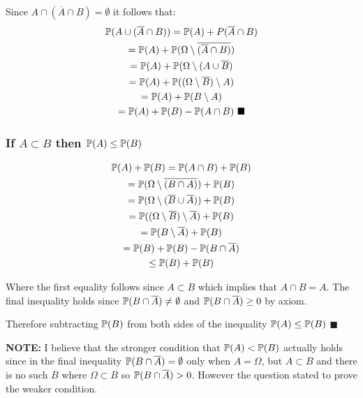 \documentclass[11pt, oneside]{article}   	%
\begin{document}
Since $A \cap (\overline{A} \cap B) = \emptyset$ it follows that:
\begin{gather*}
\Bbb P(A \cup (\overline{A} \cap B)) = \Bbb P(A) + P(\overline{A} \cap B) \\
= \Bbb P(A) + \Bbb P(\Omega \setminus \overline{(\overline{A} \cap B)}) \\
= \Bbb P(A) + \Bbb P(\Omega \setminus (A \cup \overline{B}) \\
= \Bbb P(A) + \Bbb P((\Omega \setminus \overline{B}) \setminus A) \\
= \Bbb P(A) + \Bbb P(B \setminus A) \\
= \Bbb P(A) + \Bbb P(B) - \Bbb P(A \cap B) \text{ } \blacksquare
\end{gather*}

\subsubsection{If $A \subset B$ then $\Bbb P(A) \leq \Bbb P(B)$}
\begin{gather*}
\Bbb P(A) + \Bbb P(B) = \Bbb P(A \cap B) + \Bbb P(B) \\
= \Bbb P(\Omega \setminus \overline{(B \cap A)}) + \Bbb P(B) \\
= \Bbb P(\Omega \setminus (\overline{B} \cup \overline{A})) + \Bbb P(B) \\
= \Bbb P((\Omega \setminus \overline{B}) \setminus \overline{A}) + \Bbb P(B) \\
= \Bbb P(B \setminus \overline{A}) + \Bbb P(B) \\
= \Bbb P(B) + \Bbb P(B) - \Bbb P(B \cap \overline{A})\\
\leq \Bbb P(B) + \Bbb P(B)
\end{gather*}

Where the first equality follows since $A \subset B$ which implies that $A \cap B = A$.  The final inequality holds since $\Bbb P(B \cap \overline{A}) \neq \emptyset$ and $\Bbb P(B \cap \overline{A}) \geq 0$ by axiom.

Therefore subtracting $\Bbb P(B)$ from both sides of the inequality $\Bbb P(A) \leq \Bbb P(B)$ $\blacksquare$

\textbf{NOTE:} I believe that the stronger condition that $\Bbb P(A) < \Bbb P(B)$ actually holds since in the final inequality $\Bbb P(B \cap \overline{A}) = \emptyset$ only when $A = \Omega$, but $A \subset B$ and there is no such $B$ where $\Omega \subset B$ so $\Bbb P(B \cap \overline{A}) > 0$.  However the question stated to prove the weaker condition.
\end{document}
